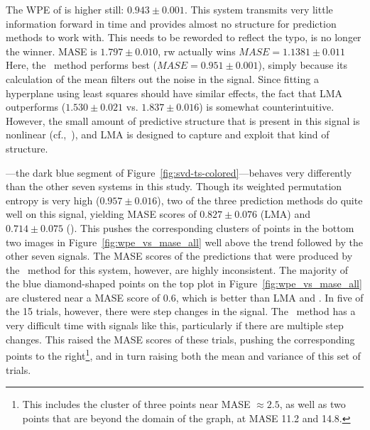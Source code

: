 The WPE of \gcc is higher still: $0.943 \pm 0.001$.  This system
transmits very little information forward in time and provides almost
no structure for prediction methods to work with.  \alert{This needs to be reworded to reflect the typo, \naive is no longer the winner. MASE is $1.797 \pm 0.010$, rw actually wins $MASE = 1.1381 \pm 0.011$  Here, the \naive
~method performs best ($MASE=0.951 \pm 0.001$), simply because its
calculation of the mean filters out the noise in the signal.  Since
fitting a hyperplane using least squares should have similar effects,
the fact that LMA outperforms \arima ($1.530 \pm 0.021$ vs. $1.837
\pm 0.016$) is somewhat counterintuitive.  However, the small amount
of predictive structure that is present in this signal is nonlinear
(cf.,~\cite{mytkowicz09}), and LMA is designed to capture and exploit
that kind of structure.}

\svdone---the dark blue segment of
Figure~\ref{fig:svd-ts-colored}---behaves very differently than the
other seven systems in this study.  Though its weighted permutation
entropy is very high ($0.957 \pm 0.016$), two of the three prediction
methods do quite well on this signal, yielding MASE scores of $0.827
\pm 0.076$ (LMA) and $0.714 \pm 0.075$ (\arima).  This pushes the
corresponding clusters of points in the bottom two images in
Figure~\ref{fig:wpe_vs_mase_all} well above the trend followed by the
other seven signals.  The MASE scores of the predictions that were
produced by the \naive ~method for this system, however, are highly
inconsistent.  The majority of the blue diamond-shaped points on the
top plot in Figure~\ref{fig:wpe_vs_mase_all} are clustered near a MASE
score of 0.6, which is better than LMA and \arima.  In five of the
15 \svdone trials, however, there were step changes in the signal.
The \naive ~method has a very difficult time with signals like this,
particularly if there are multiple step changes.  This raised the MASE
scores of these trials, pushing the corresponding points to the
right\footnote{This includes the cluster of three points near MASE
  $\approx 2.5$, as well as two points that are beyond the domain of
  the graph, at MASE 11.2 and 14.8.}, and in turn raising both the
mean and variance of this set of trials.

